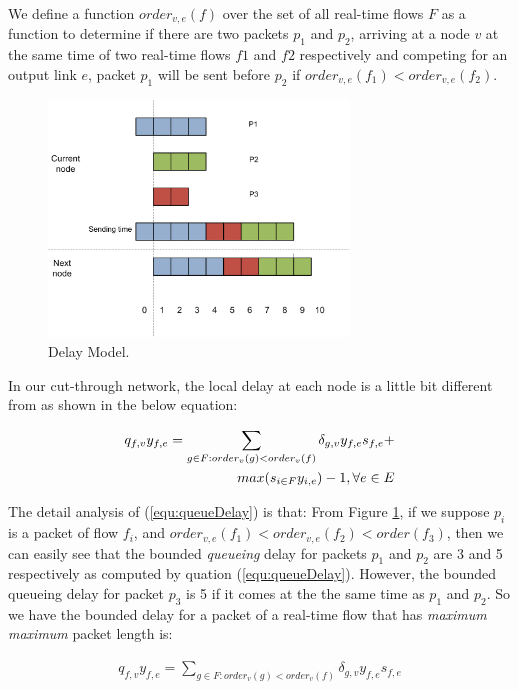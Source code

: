 \documentclass[conference, twocolumn]{IEEEtran}
\theoremstyle{definition}
\begin{document}
We define a function $order_{v,e}(f)$ over the set of all real-time flows $F$
as a function to determine if there are two packets $p_1$ and $p_2$, arriving at
a node $v$ at the same time of two real-time flows $f1$ and $f2$ respectively
and competing for an output link $e$, packet $p_1$ will be sent before $p_2$ if
$order_{v,e}(f_1) < order_{v,e}(f_2)$. 

\begin{figure}[htbp]
\centering
\includegraphics[width=8cm]{pics/DelayModel.png}
\caption[Delays for packets.]
{Delay Model.}\label{fig:DelayModel}
\end{figure}

In our cut-through network, the local delay at each node is a little bit
different from \cite{Ferrari90ascheme} as shown in the below equation:

\begin{eqnarray}\label{equ:queueDelay}
q_{f,v}y_{f,e} = \sum_{g \in F:order_v(g) <
order_v(f)}\delta_{g,v}y_{f,e}s_{f,e} + \notag \\ 
max(s_{i \in F}y_{i,e})-1, \forall e \in E
\end{eqnarray}

The detail analysis of (\ref{equ:queueDelay}) is that: From Figure
\ref{fig:DelayModel}, if we suppose $p_i$ is a packet of flow $f_i$, and
$order_{v,e}(f_1) < order_{v,e}(f_2) < order(f_3)$, then we can easily see that
the bounded {\em queueing} delay for packets $p_1$ and $p_2$ are 3 and 5
respectively as computed by quation (\ref{equ:queueDelay}). However, the bounded
queueing delay for packet $p_3$ is 5 if it comes at the the same time as $p_1$ and $p_2$. So we
have the bounded delay for a packet of a real-time flow that has {\em maximum
maximum} packet length is:

\begin{eqnarray}\label{equ:queueDelayMaxPacketFlow}
q_{f,v}y_{f,e} = \sum_{g \in F:order_v(g) <
order_v(f)}\delta_{g,v}y_{f,e}s_{f,e}
\end{eqnarray}
\end{document}

